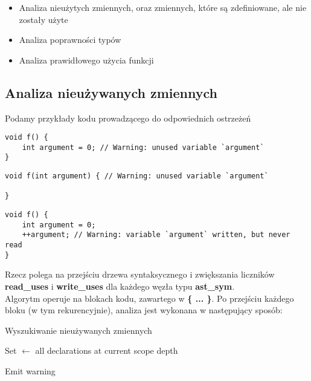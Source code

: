 \documentclass[leqno, 12pt]{article}
\newcommand{\spacing}{\vskip 0.5cm}
\begin{document}
		\begin{itemize}
			\item Analiza nieużytych zmiennych, oraz zmiennych, które są zdefiniowane, ale nie zostały użyte
			\item Analiza poprawności typów
			\item Analiza prawidłowego użycia funkcji
		\end{itemize}
		
		\subsection{Analiza nieużywanych zmiennych}
			
			Podamy przykłady kodu prowadzącego do odpowiednich ostrzeżeń
			
			\spacing

\begin{lstlisting}[label={lst:warn-unused-var}]
void f() {
	int argument = 0; // Warning: unused variable `argument`
}
\end{lstlisting}

\begin{lstlisting}[label={lst:warn-unused-var}]
void f(int argument) { // Warning: unused variable `argument`

}
\end{lstlisting}
			
\begin{lstlisting}[label={lst:warn-unused-var}]
void f() {
	int argument = 0;
	++argument; // Warning: variable `argument` written, but never read
}
\end{lstlisting}

			
			\spacing
			
			Rzecz polega na przejściu drzewa syntaksycznego i zwiększania liczników
			\textbf{read_uses} i \textbf{write_uses} dla każdego węzła typu
			\textbf{ast_sym}.
			\\
			
			Algorytm operuje na blokach kodu, zawartego w \textbf{\{ ... \}}. Po przejściu każdego bloku
			(w tym rekurencyjnie), analiza jest wykonana w następujący sposób:

			\begin{algorithm}
				\caption{Wyszukiwanie nieużywanych zmiennych}
				\begin{algorithmic}[1]

					\State Set $\gets$ all declarations at current scope depth

							\State Emit warning
						\EndIf
					\EndFor
				\EndProcedure

				\end{algorithmic}
			\end{algorithm}
\end{document}
